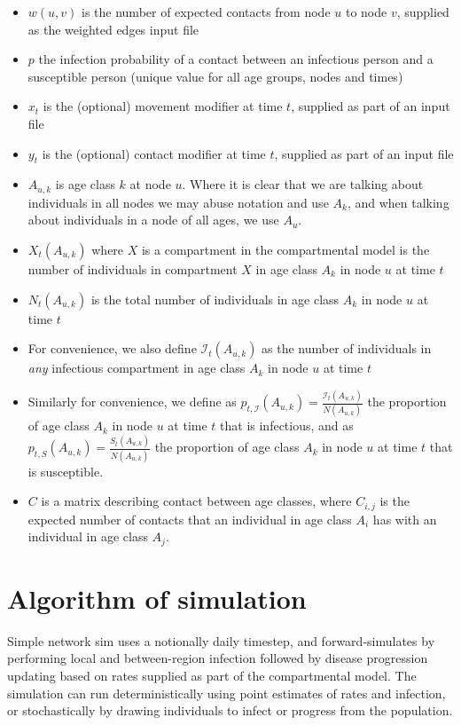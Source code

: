 \documentclass[11pt]{article}
\begin{document}
\begin{itemize}
\item $w(u, v)$ is the number of expected contacts from node $u$ to node $v$, supplied as the weighted edges input file
\item $p$ the infection probability of a contact between an infectious person and a susceptible person (unique value for all age groups, nodes and times)
\item $x_t$ is the (optional) movement modifier at time $t$, supplied as part of an input file
\item $y_t$ is the (optional) contact modifier at time $t$, supplied as part of an input file
\item $A_{u,k}$ is age class $k$ at node $u$. Where it is clear that we are talking about individuals in all nodes we may abuse notation and use $A_k$, and when talking about individuals in a node of all ages, we use $A_u$.
\item $X_t(A_{u,k})$ where $X$ is a compartment in the compartmental model is the number of individuals in compartment $X$ in age class $A_k$ in node $u$ at time $t$
\item $N_t(A_{u,k})$ is the total number of individuals in age class $A_k$ in node $u$ at time $t$
\item For convenience, we also define $\mathcal{I}_t(A_{u,k})$ as the number of individuals in \emph{any} infectious compartment in age class $A_k$ in node $u$ at time $t$
\item Similarly for convenience, we define as $p_{t, \mathcal{I}}(A_{u,k}) = \frac{\mathcal{I}_t(A_{u,k})}{N(A_{u,k})}$ the proportion of age class $A_k$ in node $u$ at time $t$ that is infectious, and as $p_{t, S}(A_{u,k}) = \frac{S_t(A_{u,k})}{N(A_{u,k})}$ the proportion of age class $A_k$ in node $u$ at time $t$ that is susceptible.
\item $C$ is a matrix describing contact between age classes, where $C_{i,j}$ is the expected number of contacts that an individual in age class $A_i$ has with an individual in age class $A_j$.
\end{itemize}


\section{Algorithm of simulation}

Simple network sim uses a notionally daily timestep, and forward-simulates by performing local and between-region infection followed by disease progression updating based on rates supplied as part of the compartmental model.  The simulation can run deterministically using point estimates of rates and infection, or stochastically by drawing individuals to infect or progress from the population.  
\end{document}
